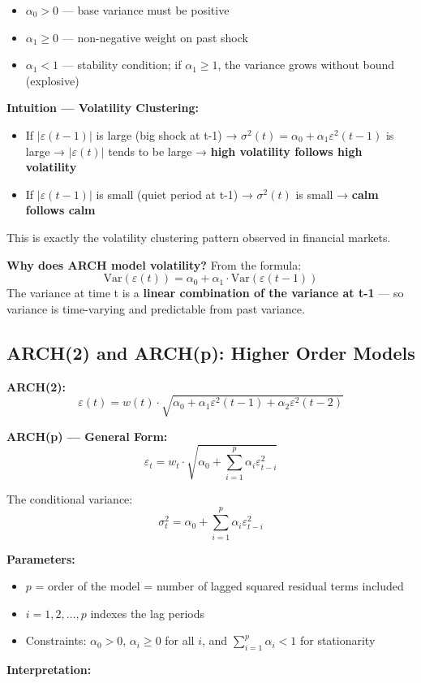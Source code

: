 \documentclass[12pt,openany]{book}
\theoremstyle{definition}
\theoremstyle{remark}
\begin{document}
\begin{itemize}
\item $\alpha_0 > 0$ --- base variance must be positive


\item $\alpha_1 \geq 0$ --- non-negative weight on past shock


\item $\alpha_1 < 1$ --- stability condition; if $\alpha_1 \geq 1$, the variance grows without bound (explosive)


\end{itemize}
\textbf{Intuition --- Volatility Clustering:}

\begin{itemize}
\item If $|\varepsilon(t-1)|$ is large (big shock at t-1) → $\sigma^2(t) = \alpha_0 + \alpha_1 \varepsilon^2(t-1)$ is large → $|\varepsilon(t)|$ tends to be large → \textbf{high volatility follows high volatility}


\item If $|\varepsilon(t-1)|$ is small (quiet period at t-1) → $\sigma^2(t)$ is small → \textbf{calm follows calm}


\end{itemize}
This is exactly the volatility clustering pattern observed in financial markets.

\textbf{Why does ARCH model volatility?} From the formula: \[
\text{Var}(\varepsilon(t)) = \alpha_0 + \alpha_1 \cdot \text{Var}(\varepsilon(t-1))
\] The variance at time t is a \textbf{linear combination of the variance at t-1} --- so variance is time-varying and predictable from past variance.

\medskip
\subsection{ARCH(2) and ARCH(p): Higher Order Models}
\textbf{ARCH(2):} \[
\varepsilon(t) = w(t) \cdot \sqrt{\alpha_0 + \alpha_1 \varepsilon^2(t-1) + \alpha_2 \varepsilon^2(t-2)}
\]

\textbf{ARCH(p) --- General Form:} \[
\boxed{\varepsilon_t = w_t \cdot \sqrt{\alpha_0 + \sum_{i=1}^{p} \alpha_i \varepsilon^2_{t-i}}}
\]

The conditional variance: \[
\sigma^2_t = \alpha_0 + \sum_{i=1}^{p} \alpha_i \varepsilon^2_{t-i}
\]

\textbf{Parameters:}

\begin{itemize}
\item $p$ = order of the model = number of lagged squared residual terms included


\item $i = 1, 2, \ldots, p$ indexes the lag periods


\item Constraints: $\alpha_0 > 0$, $\alpha_i \geq 0$ for all $i$, and $\sum_{i=1}^{p} \alpha_i < 1$ for stationarity


\end{itemize}
\textbf{Interpretation:}
\end{document}
